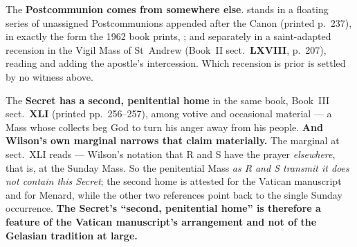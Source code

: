 The \textbf{Postcommunion comes from somewhere else}. 
stands in a floating series of unassigned Postcommunions appended after the
Canon (printed p.~237), in exactly the form the 1962 book prints,
; and separately in a saint-adapted recension in the Vigil
Mass of St~Andrew (Book~II sect.~\textbf{LXVIII}, p.~207), reading  and adding the apostle's intercession. Which recension is prior is settled by no
witness above.



The \textbf{Secret has a second, penitential home} in the same book, Book~III
sect.~\textbf{XLI} (printed pp.~256--257), among votive and occasional material
--- a Mass whose collects beg God to turn his anger away from his people.
\textbf{And Wilson's own marginal narrows that claim materially.} The marginal at
sect.~XLI reads  --- Wilson's notation that R and S have
the prayer \emph{elsewhere}, that is, at the Sunday Mass. So the penitential
Mass \emph{as R and S transmit it does not contain this Secret}; the second home
is attested for the Vatican manuscript and for Menard, while the other two
references point back to the single Sunday occurrence. \textbf{The Secret's
``second, penitential home'' is therefore a feature of the Vatican manuscript's
arrangement and not of the Gelasian tradition at large.}

